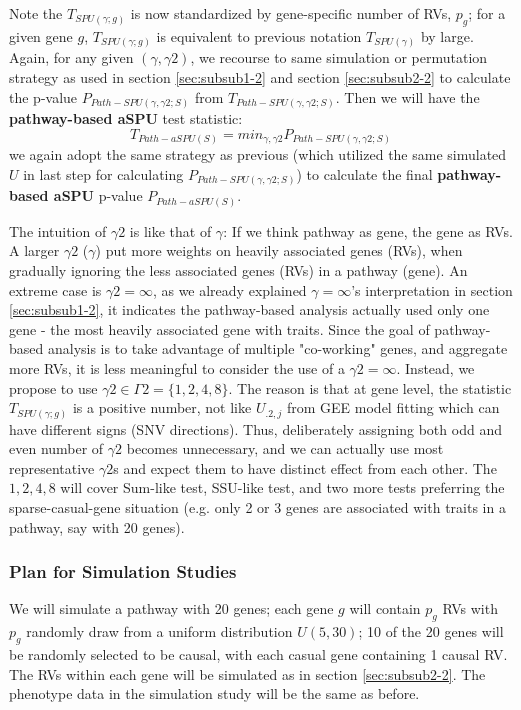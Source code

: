 \documentclass[12pt]{article}
\begin{document}
Note the $T_ { SPU(\gamma ; g) }$ is now standardized by gene-specific number of RVs, $p_g$; for a given gene $g$, $T_ { SPU(\gamma ; g) }$ is equivalent to previous notation $T_ { SPU(\gamma ) }$ by large. Again, for any given $(\gamma, \gamma2)$, we recourse to same simulation or permutation strategy as used in section \ref{sec:subsub1-2} and section \ref{sec:subsub2-2} to calculate the p-value $P _ { Path-SPU(\gamma, \gamma2 ; S) }$ from $T _ { Path-SPU(\gamma, \gamma2 ; S) }$. Then we will have the \textbf{pathway-based aSPU} test statistic:
\begin{equation}
T _ { Path-aSPU(S) } = min_{\gamma, \gamma2} P _ { Path-SPU(\gamma, \gamma2 ; S) }
\end{equation}
we again adopt the same strategy as previous (which utilized the same simulated $U$ in last step for calculating $P _ { Path-SPU(\gamma, \gamma2 ; S) }$) to calculate the final \textbf{pathway-based aSPU} p-value $P _ { Path-aSPU(S) }$.

The intuition of $\gamma 2$ is like that of $\gamma$: If we think pathway as gene, the gene as RVs. A larger $\gamma 2$ ($\gamma$) put more weights on heavily associated genes (RVs), when gradually ignoring the less associated genes (RVs) in a pathway (gene). An extreme case is $\gamma 2 = \infty$, as we already explained $\gamma = \infty$'s interpretation in section \ref{sec:subsub1-2}, it indicates the pathway-based analysis actually used only one gene - the most heavily associated gene with traits. Since the goal of pathway-based analysis is to take advantage of multiple "co-working" genes, and aggregate more RVs, it is less meaningful to consider the use of a $\gamma 2= \infty$. Instead, we propose to use $\gamma 2 \in \Gamma 2 = \{1,2,4,8\}$. The reason is that at gene level, the statistic $T_ { SPU(\gamma ; g) }$ is a positive number, not like $U_{.2,j}$ from GEE model fitting which can have different signs (SNV directions). Thus, deliberately assigning both odd and even number of $\gamma 2$ becomes unnecessary, and we can actually use most representative $\gamma 2$s and expect them to have distinct effect from each other. The $1,2,4,8$ will cover Sum-like test, SSU-like test, and two more tests preferring the sparse-casual-gene situation (e.g. only 2 or 3 genes are associated with traits in a pathway, say with 20 genes). 

\subsubsection{Plan for Simulation Studies}\label{sec:aim2-2}
We will simulate a pathway with 20 genes; each gene $g$ will contain $p_g$ RVs with $p_g$ randomly draw from a uniform distribution $U(5,30)$; 10 of the 20 genes will be randomly selected to be causal, with each casual gene containing 1 causal RV. The RVs within each gene will be simulated as in section \ref{sec:subsub2-2}. The phenotype data in the simulation study will be the same as before.
\end{document}
